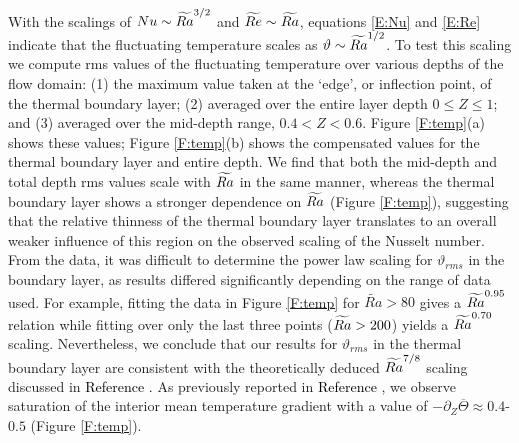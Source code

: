 With the scalings of $Nu \sim \widetilde{Ra}^{3/2}$ and $\widetilde{Re} \sim \widetilde{Ra}$, equations \eqref{E:Nu} and \eqref{E:Re} indicate that the fluctuating temperature scales as $\vartheta \sim \widetilde{Ra}^{1/2}$. 
To test this scaling we compute rms values of the fluctuating temperature over various depths of the flow domain: (1) the maximum value taken at the `edge', or inflection point, of the thermal boundary layer; (2) averaged over the entire layer depth $0 \le Z \le 1$; and (3) averaged over the mid-depth range, $0.4 < Z < 0.6$. 
Figure \ref{F:temp}(a) shows these values; Figure \ref{F:temp}(b) shows the compensated values for the thermal boundary layer and entire depth. 
We find that both the mid-depth and total depth rms values scale with $\widetilde{Ra}$ in the same manner, whereas the thermal boundary layer shows a stronger dependence on $\widetilde{Ra}$ (Figure \ref{F:temp}\protect{}), suggesting that the relative thinness of the thermal boundary layer translates to an overall weaker influence of this region on the observed scaling of the Nusselt number. 
From the data, it was difficult to determine the power law scaling for $\vartheta_{rms}$ in the boundary layer, as results differed significantly depending on the range of data used.
For example, fitting the data in Figure \ref{F:temp}\protect{} for $\widetilde{Ra}>80$ gives a \textcolor{black}{$\widetilde{Ra}^{0.95}$} relation while fitting over only the last three points ($\widetilde{Ra}>200$) yields a \textcolor{black}{$\widetilde{Ra}^{0.70}$} scaling. 
Nevertheless, we conclude that our results for $\vartheta_{rms}$ in the thermal boundary layer are consistent with the theoretically deduced $\widetilde{Ra}^{7/8}$ scaling discussed in \textcolor{black}{Reference \citep{kJ12b}.}
As previously reported in \textcolor{black}{Reference \citep{mS06}}, we observe saturation of the interior mean temperature gradient with a value of $-\partial_{Z}\overline\Theta \approx 0.4$-$0.5$ (Figure \ref{F:temp}\protect{}). 


